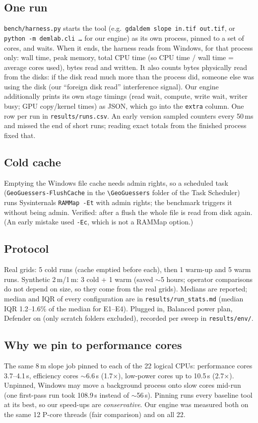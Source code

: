 ﻿\documentclass[11pt,a4paper]{article}
\newcommand{\code}[1]{\texttt{#1}}
\begin{document}
\subsection{One run}
\code{bench/harness.py} starts the tool (e.g.\ \code{gdaldem slope in.tif out.tif}, or \code{python -m demlab.cli \dots}
for our engine) as its own process, pinned to a set of cores, and waits. When it ends, the harness reads from Windows,
for that process only: wall time, peak memory, total CPU time (so CPU time / wall time = average cores used), bytes
read and written. It also counts bytes physically read from the disks: if the disk read much more than the process
did, someone else was using the disk (our ``foreign disk read'' interference signal). Our engine additionally prints its
own stage timings (read wait, compute, write wait, writer busy; GPU copy/kernel times) as JSON, which go into the
\code{extra} column. One row per run in \code{results/runs.csv}. An early version sampled counters every 50\,ms and missed
the end of short runs; reading exact totals from the finished process fixed that.

\subsection{Cold cache}
Emptying the Windows file cache needs admin rights, so a scheduled task (\code{GeoGuessers-FlushCache} in the
\code{\textbackslash GeoGuessers} folder of the Task Scheduler) runs Sysinternals \code{RAMMap -Et} with admin rights; the benchmark triggers it without being admin. Verified: after a flush the whole file is read from disk again.
(An early mistake used \code{-Ec}, which is not a RAMMap option.)

\subsection{Protocol}
Real grids: 5 cold runs (cache emptied before each), then 1 warm-up and 5 warm runs. Synthetic 2\,m/1\,m: 3 cold + 1
warm (saved $\sim$5 hours; operator comparisons do not depend on size, so they come from the real grids). Medians are
reported; median and IQR of every configuration are in \code{results/run\_stats.md} (median IQR 1.2--1.6\% of the
median for E1--E4). Plugged in, Balanced power plan, Defender on (only scratch folders excluded), recorded per sweep in
\code{results/env/}.

\subsection{Why we pin to performance cores}
The same 8\,m slope job pinned to each of the 22 logical CPUs: performance cores 3.7--4.1\,s, efficiency cores
$\sim$6.6\,s (1.7$\times$), low-power cores up to 10.5\,s (2.7$\times$). Unpinned, Windows may move a background process
onto slow cores mid-run (one first-pass run took 108.9\,s instead of $\sim$56\,s). Pinning runs every baseline tool at its
best, so our speed-ups are \emph{conservative}. Our engine was measured both on the same 12 P-core threads (fair
comparison) and on all 22.
\end{document}
